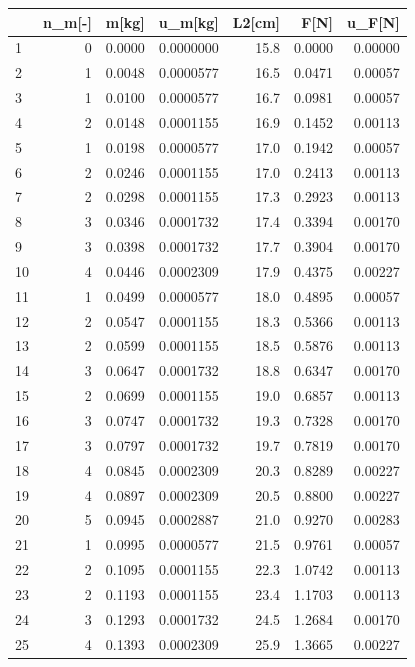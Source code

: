 \documentclass[
  9pt,
]{article}
\begin{document}
\begin{longtable}[]{@{}lrrrrrr@{}}
\toprule()
& n\_m{[}-{]} & m{[}kg{]} & u\_m{[}kg{]} & L2{[}cm{]} & F{[}N{]} &
u\_F{[}N{]} \\
\midrule()
\endhead
1 & 0 & 0.0000 & 0.0000000 & 15.8 & 0.0000 & 0.00000 \\
2 & 1 & 0.0048 & 0.0000577 & 16.5 & 0.0471 & 0.00057 \\
3 & 1 & 0.0100 & 0.0000577 & 16.7 & 0.0981 & 0.00057 \\
4 & 2 & 0.0148 & 0.0001155 & 16.9 & 0.1452 & 0.00113 \\
5 & 1 & 0.0198 & 0.0000577 & 17.0 & 0.1942 & 0.00057 \\
6 & 2 & 0.0246 & 0.0001155 & 17.0 & 0.2413 & 0.00113 \\
7 & 2 & 0.0298 & 0.0001155 & 17.3 & 0.2923 & 0.00113 \\
8 & 3 & 0.0346 & 0.0001732 & 17.4 & 0.3394 & 0.00170 \\
9 & 3 & 0.0398 & 0.0001732 & 17.7 & 0.3904 & 0.00170 \\
10 & 4 & 0.0446 & 0.0002309 & 17.9 & 0.4375 & 0.00227 \\
11 & 1 & 0.0499 & 0.0000577 & 18.0 & 0.4895 & 0.00057 \\
12 & 2 & 0.0547 & 0.0001155 & 18.3 & 0.5366 & 0.00113 \\
13 & 2 & 0.0599 & 0.0001155 & 18.5 & 0.5876 & 0.00113 \\
14 & 3 & 0.0647 & 0.0001732 & 18.8 & 0.6347 & 0.00170 \\
15 & 2 & 0.0699 & 0.0001155 & 19.0 & 0.6857 & 0.00113 \\
16 & 3 & 0.0747 & 0.0001732 & 19.3 & 0.7328 & 0.00170 \\
17 & 3 & 0.0797 & 0.0001732 & 19.7 & 0.7819 & 0.00170 \\
18 & 4 & 0.0845 & 0.0002309 & 20.3 & 0.8289 & 0.00227 \\
19 & 4 & 0.0897 & 0.0002309 & 20.5 & 0.8800 & 0.00227 \\
20 & 5 & 0.0945 & 0.0002887 & 21.0 & 0.9270 & 0.00283 \\
21 & 1 & 0.0995 & 0.0000577 & 21.5 & 0.9761 & 0.00057 \\
22 & 2 & 0.1095 & 0.0001155 & 22.3 & 1.0742 & 0.00113 \\
23 & 2 & 0.1193 & 0.0001155 & 23.4 & 1.1703 & 0.00113 \\
24 & 3 & 0.1293 & 0.0001732 & 24.5 & 1.2684 & 0.00170 \\
25 & 4 & 0.1393 & 0.0002309 & 25.9 & 1.3665 & 0.00227 \\

\end{longtable}
\end{document}
